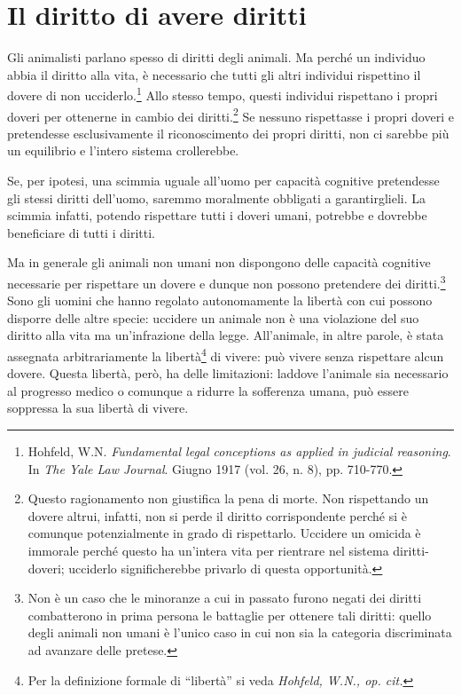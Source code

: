 \chapter{Il diritto di avere diritti}
\label{ch:il-diritto-di-avere-diritti}

Gli animalisti parlano spesso di diritti degli animali. Ma perché un individuo abbia il diritto alla
vita, è necessario che tutti gli altri individui rispettino il dovere di non
ucciderlo.\footnote{Hohfeld, W.N. \emph{Fundamental legal conceptions as applied in judicial
reasoning}. In \emph{The Yale Law Journal}. Giugno 1917 (vol. 26, n. 8), pp. 710-770.} Allo stesso
tempo, questi individui rispettano i propri doveri per ottenerne in cambio dei
diritti.\footnote{Questo ragionamento non giustifica la pena di morte. Non rispettando un dovere
altrui, infatti, non si perde il diritto corrispondente perché si è comunque potenzialmente in grado
di rispettarlo. Uccidere un omicida è immorale perché questo ha un'intera vita per rientrare nel
sistema diritti- doveri; ucciderlo significherebbe privarlo di questa opportunità.} Se nessuno
rispettasse i propri doveri e pretendesse esclusivamente il riconoscimento dei propri diritti, non
ci sarebbe più un equilibrio e l'intero sistema crollerebbe.

Se, per ipotesi, una scimmia uguale all'uomo per capacità cognitive pretendesse gli stessi diritti
dell'uomo, saremmo moralmente obbligati a garantirglieli. La scimmia infatti, potendo rispettare
tutti i doveri umani, potrebbe e dovrebbe beneficiare di tutti i diritti.

Ma in generale gli animali non umani non dispongono delle capacità cognitive necessarie per
rispettare un dovere e dunque non possono pretendere dei diritti.\footnote{Non è un caso che le
minoranze a cui in passato furono negati dei diritti combatterono in prima persona le battaglie per
ottenere tali diritti: quello degli animali non umani è l'unico caso in cui non sia la categoria
discriminata ad avanzare delle pretese.} Sono gli uomini che hanno regolato autonomamente la libertà
con cui possono disporre delle altre specie: uccidere un animale non è una violazione del suo
diritto alla vita ma un'infrazione della legge. All'animale, in altre parole, è stata assegnata
arbitrariamente la libertà\footnote{Per la definizione formale di ``libertà'' si veda \emph{Hohfeld,
W.N., op. cit.}} di vivere: può vivere senza rispettare alcun dovere. Questa libertà, però, ha delle
limitazioni: laddove l'animale sia necessario al progresso medico o comunque a ridurre la sofferenza
umana, può essere soppressa la sua libertà di vivere.
